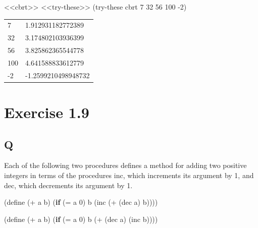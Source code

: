 \documentclass[
]{article}
\newenvironment{Shaded}{}{}
\newcommand{\DecValTok}[1]{\textcolor[rgb]{0.25,0.63,0.44}{#1}}
\newcommand{\ExtensionTok}[1]{#1}
\newcommand{\FunctionTok}[1]{\textcolor[rgb]{0.02,0.16,0.49}{#1}}
\newcommand{\KeywordTok}[1]{\textcolor[rgb]{0.00,0.44,0.13}{\textbf{#1}}}
\newcommand{\NormalTok}[1]{#1}
\newcommand{\OperatorTok}[1]{\textcolor[rgb]{0.40,0.40,0.40}{#1}}
\begin{document}
\begin{Shaded}
\begin{Highlighting}[numbers=left,,]
\NormalTok{\textless{}\textless{}cbrt\textgreater{}\textgreater{}}
\NormalTok{\textless{}\textless{}try{-}these\textgreater{}\textgreater{}}
\NormalTok{(try{-}these cbrt }\DecValTok{7} \DecValTok{32} \DecValTok{56} \DecValTok{100}\NormalTok{ {-}}\DecValTok{2}\NormalTok{)}
\end{Highlighting}
\end{Shaded}

\begin{longtable}[]{@{}ll@{}}
\toprule
\endhead
7 & 1.912931182772389 \\
32 & 3.174802103936399 \\
56 & 3.825862365544778 \\
100 & 4.641588833612779 \\
-2 & -1.2599210498948732 \\
\bottomrule
\end{longtable}

\hypertarget{exercise-1.9}{%
\section{Exercise 1.9}\label{exercise-1.9}}

\hypertarget{q-8}{%
\subsection{Q}\label{q-8}}

Each of the following two procedures defines a method for adding two
positive integers in terms of the procedures inc, which increments its
argument by 1, and dec, which decrements its argument by 1.

\begin{Shaded}
\begin{Highlighting}[numbers=left,,]
\NormalTok{(}\ExtensionTok{define}\FunctionTok{ }\NormalTok{(}\OperatorTok{+}\NormalTok{ a b)}
\NormalTok{  (}\KeywordTok{if}\NormalTok{ (}\OperatorTok{=}\NormalTok{ a }\DecValTok{0}\NormalTok{)}
\NormalTok{      b}
\NormalTok{      (inc (}\OperatorTok{+}\NormalTok{ (dec a) b))))}

\NormalTok{(}\ExtensionTok{define}\FunctionTok{ }\NormalTok{(}\OperatorTok{+}\NormalTok{ a b)}
\NormalTok{  (}\KeywordTok{if}\NormalTok{ (}\OperatorTok{=}\NormalTok{ a }\DecValTok{0}\NormalTok{)}
\NormalTok{      b}
\NormalTok{      (}\OperatorTok{+}\NormalTok{ (dec a) (inc b))))}
\end{Highlighting}
\end{Shaded}
\end{document}
